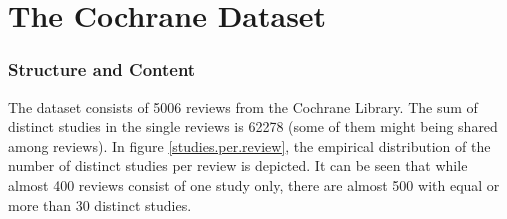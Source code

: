 


\begin{knitrout}
\color{fgcolor}\begin{kframe}
\begin{alltt}
\hlopt{$}\hlstd{(}\hlstd{=}\hlstd{,}
               \hlstd{=}\hlstd{,} \hlstd{=}\hlstd{,}
               \hlstd{=}\hlstd{,} \hlstd{=}\hlstd{,}
               \hlstd{=}\hlstd{,}
               \hlstd{=}\hlstd{,} \hlstd{=}\hlstd{,}
               \hlstd{=}\hlstd{,} \hlstd{=}\hlstd{,} 
               \hlstd{=}
\hlstd{)}
\hlstd{(}\hlstd{=}\hlstd{)}
\end{alltt}
\end{kframe}
\end{knitrout}





\chapter{The Cochrane Dataset} 


\subsection{Structure and Content}
The dataset consists of 5006 reviews from the Cochrane Library. The sum of distinct studies in the single reviews is 62278 (some of them might being shared among reviews). In figure \ref{studies.per.review}, the empirical distribution of the number of distinct studies per review is depicted. It can be seen that while almost 400 reviews consist of one study only, there are almost 500 with equal or more than 30 distinct studies. 


